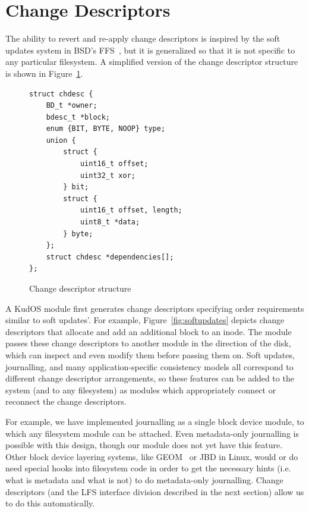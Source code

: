 \preparagraphspacing{}
\section*{Change Descriptors}
\label{sec:chdescs}

The ability to revert and re-apply change descriptors is inspired by the soft
updates system in BSD's FFS~\cite{ganger00soft}, but it is generalized so that
it is not specific to any particular filesystem. A simplified version of the
change descriptor structure is shown in Figure~\ref{fig:chdesc}.

\begin{figure}
\begin{verbatim}
struct chdesc {
    BD_t *owner;
    bdesc_t *block;
    enum {BIT, BYTE, NOOP} type;
    union {
        struct {
            uint16_t offset;
            uint32_t xor;
        } bit;
        struct {
            uint16_t offset, length;
            uint8_t *data;
        } byte;
    };
    struct chdesc *dependencies[];
};
\end{verbatim}
\vspace{-12pt}
\caption{\label{fig:chdesc} Change descriptor structure}
\end{figure}

A KudOS module first generates change descriptors specifying order
requirements similar to soft updates'. For example,
Figure~\ref{fig:softupdates} depicts change descriptors that allocate
and add an additional block to an inode.
%
The module passes these change descriptors to another module in the
direction of the disk, which can inspect and even modify them before
passing them on. Soft updates, journalling, and many application-specific
consistency models all correspond to different change descriptor arrangements,
so these features can be added to the system (and to any filesystem) as modules
which appropriately connect or reconnect the change descriptors.

For example, we have implemented journalling as a single block device module, to
which any filesystem module can be attached. Even metadata-only journalling is
possible with this design, though our module does not yet have this feature.
Other block device layering systems, like GEOM~\cite{geom} or JBD in Linux,
would or do need special hooks into filesystem code in order to get the
necessary hints (i.e. what is metadata and what is not) to do metadata-only
journalling. Change descriptors (and the LFS interface division described in the
next section) allow us to do this automatically.

